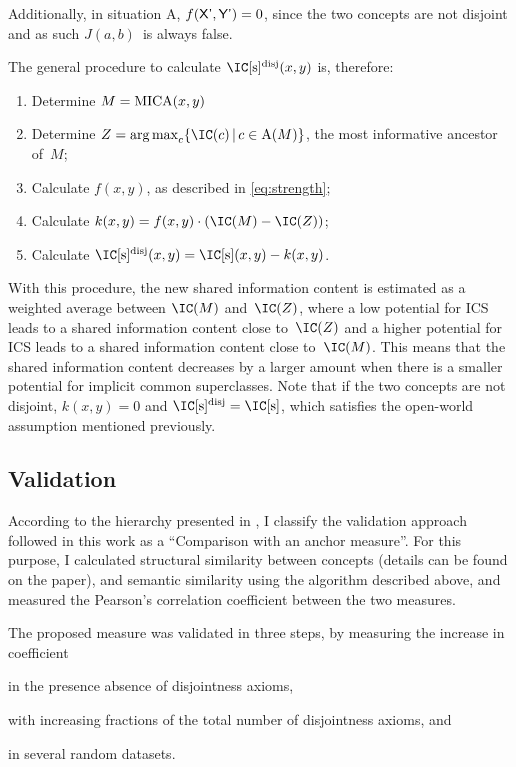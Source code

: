 Additionally, in situation A, $f(\protect\textsf{X'}, \protect\textsf{Y'}) = 0$, since the two concepts are not disjoint and as such $J(a,b)$~is always false.

The general procedure to calculate $\ICsdis(x,y)$ is, therefore:
\begin{enumerate}
    \item Determine $M = \operatorname{MICA}(x,y)$
    \item Determine $Z = \argmax_c \{\IC(c)\,|\,c\in\anc(M)\}$, \ie the most informative ancestor of~$M$;
    \item Calculate $f(x, y)$, as described in \eqref{eq:strength};
    \item Calculate $k(x,y) = f(x,y)\cdot(\IC(M) - \IC(Z))$;
    \item Calculate $\ICsdis(x,y)=\ICs(x,y)-k(x,y)$.
\end{enumerate}

With this procedure, the new shared information content is estimated as a weighted average between $\IC(M)$ and~$\IC(Z)$, where a low potential for ICS leads to a shared information content close to~$\IC(Z)$ and a higher potential for ICS leads to a shared information content close to~$\IC(M)$. This means that the shared information content decreases by a larger amount when there is a smaller potential for implicit common superclasses. Note that if the two concepts are not disjoint, $k(x,y)=0$ and $\ICsdis=\ICs$, which satisfies the open-world assumption mentioned previously.


\subsection{Validation}

According to the hierarchy presented in , I classify the validation approach followed in this work as a ``Comparison with an anchor measure''. For this purpose, I calculated structural similarity between  concepts (details can be found on the paper), and semantic similarity using the algorithm described above, and measured the Pearson's correlation coefficient between the two measures.

The proposed measure was validated in three steps, by measuring the increase in coefficient
\begin{paralist}
    \item in the presence \vs absence of disjointness axioms,
    \item with increasing fractions of the total number of disjointness axioms, and
    \item in several random datasets.
\end{paralist}

